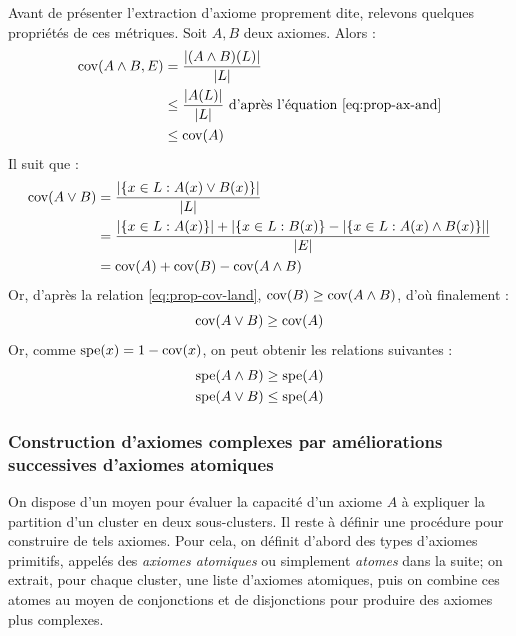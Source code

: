 Avant de présenter l'extraction d'axiome proprement dite, relevons quelques propriétés de ces métriques. Soit $A, B$ deux axiomes. Alors :
\begin{align}
\operatorname{cov}(A \land B, E) &= \frac{|(A \land B)(L) |}{| L |} \\
                &\leq \frac{|A(L) |}{| L |} \text{ d'après l'équation \ref{eq:prop-ax-and}} \\
                &\leq \operatorname{cov}(A) \label{eq:prop-cov-land}
\end{align}
Il suit que :
\begin{align}
\operatorname{cov}(A \lor B) &= \frac{|\{ x \in L : A(x) \lor B(x) \}|}{| L |} \\
  &= \frac{|\{ x \in L : A(x) \}| + |\{ x \in L :  B(x) \} - |\{ x \in L : A(x) \land B(x) \}||}{|E|} \\
  &= \operatorname{cov}(A) + \operatorname{cov}(B) - \operatorname{cov}(A \land B)
\end{align}
Or, d'après la relation \ref{eq:prop-cov-land}, $\operatorname{cov}(B) \geq \operatorname{cov}(A \land B)$, d'où finalement :
\begin{equation}
    \operatorname{cov}(A \lor B) \geq \operatorname{cov}(A)
\end{equation}
Or, comme $\operatorname{spe}(x) = 1 - \operatorname{cov}(x)$, on peut obtenir les relations suivantes :
\begin{align}
    \operatorname{spe}(A \land B) &\geq \operatorname{spe}(A) \label{eq:prop-spe-land} \\
    \operatorname{spe}(A \lor B) &\leq \operatorname{spe}(A) 
\end{align}

\subsubsection{Construction d'axiomes complexes par améliorations successives d'axiomes atomiques}

On dispose d'un moyen pour évaluer la capacité d'un axiome $A$ à expliquer la partition d'un cluster en deux sous-clusters. Il reste à définir une procédure pour construire de tels axiomes. Pour cela, on définit d'abord des types d'axiomes primitifs, appelés des \textit{axiomes atomiques} ou simplement \textit{atomes} dans la suite; on extrait, pour chaque cluster, une liste d'axiomes atomiques, puis on combine ces atomes au moyen de conjonctions et de disjonctions pour produire des axiomes plus complexes.

